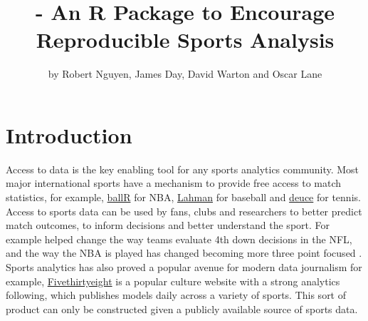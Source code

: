 \title{ - An R Package to Encourage Reproducible Sports Analysis}
\author{by Robert Nguyen, James Day, David Warton and Oscar Lane}

\maketitle



\section{Introduction}

Access to data is the key enabling tool for any sports analytics community. Most major international sports have a mechanism to provide free access to match statistics, for example, \href{https://cran.r-project.org/web/packages/ballr/ballr.pdf}{ballR} for NBA, \href{https://cran.r-project.org/web/packages/Lahman/Lahman.pdf}{Lahman}  for baseball and \href{https://github.com/skoval/deuce}{deuce} for tennis. Access to sports data can be used by fans, clubs and researchers to better predict match outcomes, to inform decisions and better understand the sport. For example \citep{romer2006firms} helped change the way teams evaluate 4th down decisions in the NFL, and the way the NBA is played has changed becoming more three point focused \citep{goldman2013live}. Sports analytics has also proved a popular avenue for modern data journalism for example, \href{https://fivethirtyeight.com}{Fivethirtyeight} is a popular culture website with a strong analytics following, which publishes models daily across a variety of sports. This sort of product can only be constructed given a publicly available source of sports data.



